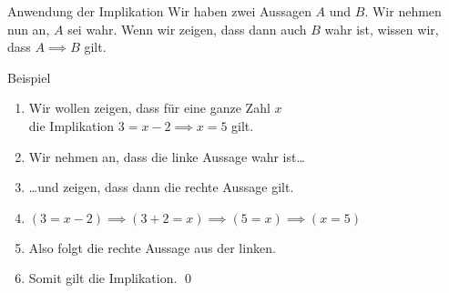 \begin{frame}{Anwendung der Implikation}
	Wir haben zwei Aussagen $A$ und $B$. Wir nehmen nun an, $A$ sei wahr. Wenn wir zeigen, dass dann auch $B$ wahr ist, wissen wir, dass $A \implies B$ gilt.
	\begin{exampleblock}{Beispiel}
		\begin{enumerate}
			\item<1-> Wir wollen zeigen, dass für eine ganze Zahl $x$ \\
			      die Implikation $3 = x - 2 \implies x = 5$ gilt.
			\item<2-> Wir nehmen an, dass die linke Aussage wahr ist\dots
			\item<3-> \dots und zeigen, dass dann die rechte Aussage gilt.
			\item<4-> $(3 = x - 2) \implies (3 + 2 = x) \implies (5 = x) \implies (x = 5)$
			\item<5-> Also folgt die rechte Aussage aus der linken.
			\item<6-> Somit gilt die Implikation. \qed\;
		\end{enumerate}
	\end{exampleblock}
\end{frame}
